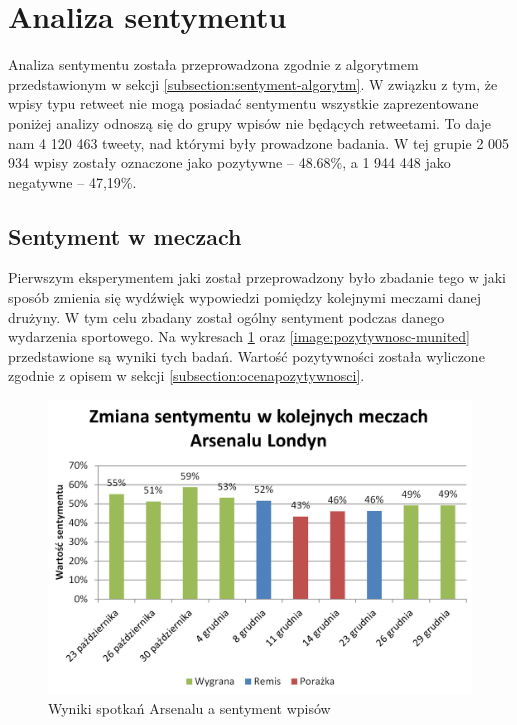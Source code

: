 \section{Analiza sentymentu}
\label{section:analizasentymentu2}

Analiza sentymentu została przeprowadzona zgodnie z algorytmem przedstawionym w
sekcji \ref{subsection:sentyment-algorytm}. W związku z tym, że wpisy typu
retweet nie mogą posiadać sentymentu wszystkie zaprezentowane poniżej analizy
odnoszą się do grupy wpisów nie będących retweetami. To daje nam 4 120 463
tweety, nad którymi były prowadzone badania. W tej grupie 2 005 934 wpisy
zostały oznaczone jako pozytywne -- 48.68\%, a 1 944 448 jako negatywne --
47,19\%.



\subsection{Sentyment w meczach}
\label{subsection:sentymentwmeczach}
Pierwszym eksperymentem jaki został przeprowadzony było zbadanie tego w jaki 
sposób zmienia się wydźwięk wypowiedzi pomiędzy kolejnymi meczami danej drużyny.
W tym celu zbadany został ogólny sentyment podczas danego wydarzenia sportowego.
Na wykresach \ref{image:pozytywnosc-arsenal} oraz 
\ref{image:pozytywnosc-munited} przedstawione są wyniki tych badań.
Wartość pozytywności została wyliczone zgodnie z opisem w sekcji
\ref{subsection:ocenapozytywnosci}.

\clearpage

\begin{figure}[ht!]
\centering
\includegraphics[width=120mm]{img/pozytywnosc-arsenal2.png}
\caption{Wyniki spotkań Arsenalu a sentyment wpisów}
\label{image:pozytywnosc-arsenal}
\end{figure}

